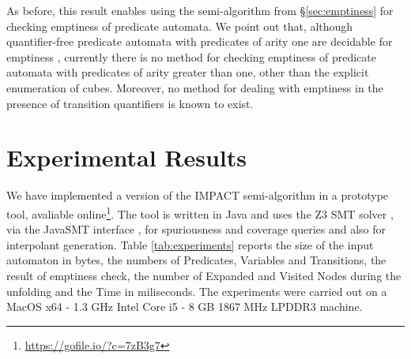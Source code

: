 As before, this result enables using the
semi-algorithm from \S\ref{sec:emptiness} for checking emptiness of
predicate automata.  We point out that, although quantifier-free
predicate automata with predicates of arity one are decidable for
emptiness \cite{Farzan15}, currently there is no method for checking
emptiness of predicate automata with predicates of arity greater than
one, other than the explicit enumeration of cubes. Moreover, no method
for dealing with emptiness in the presence of transition quantifiers
is known to exist.
\fi

\section{Experimental Results}

We have implemented a version of the IMPACT semi-algorithm
\cite{McMillan06} in a prototype tool, avaliable
online\footnote{\url{https://gofile.io/?c=7zB3g7}}. The tool is
written in Java and uses the Z3 SMT solver \cite{z3}, via the JavaSMT
interface \cite{javasmt}, for spuriousness and coverage queries and
also for interpolant generation. Table \ref{tab:experiments} reports
the size of the input automaton in bytes, the numbers of Predicates,
Variables and Transitions, the result of emptiness check, the number
of Expanded and Visited Nodes during the unfolding and the Time in
miliseconds.  The experiments were carried out on a MacOS x64 - 1.3
GHz Intel Core i5 - 8 GB 1867 MHz LPDDR3 machine.

